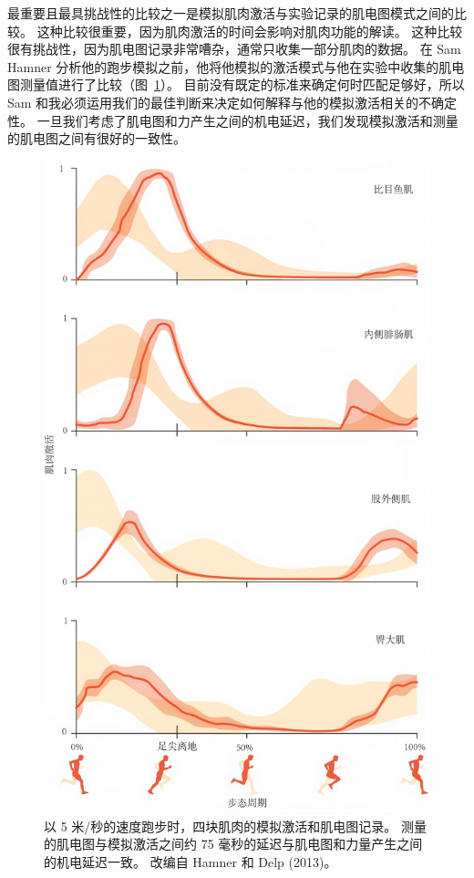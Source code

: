 最重要且最具挑战性的比较之一是模拟肌肉激活与实验记录的肌电图模式之间的比较。
这种比较很重要，因为肌肉激活的时间会影响对肌肉功能的解读。
这种比较很有挑战性，因为肌电图记录非常嘈杂，通常只收集一部分肌肉的数据。
在 Sam Hamner 分析他的跑步模拟之前，他将他模拟的激活模式与他在实验中收集的肌电图测量值进行了比较（图~\ref{fig:10_11}）。
目前没有既定的标准来确定何时匹配足够好，所以 Sam 和我必须运用我们的最佳判断来决定如何解释与他的模拟激活相关的不确定性。
一旦我们考虑了肌电图和力产生之间的机电延迟，我们发现模拟激活和测量的肌电图之间有很好的一致性。


\begin{figure}[!htb]
	\centering
	\includegraphics[width=0.8\linewidth]{chap10/10_11}
	\caption{以 5 米/秒的速度跑步时，四块肌肉的模拟激活和肌电图记录。
		测量的肌电图与模拟激活之间约 75 毫秒的延迟与肌电图和力量产生之间的机电延迟一致。
		改编自 Hamner 和 Delp (2013)。 \label{fig:10_11}}
\end{figure}


